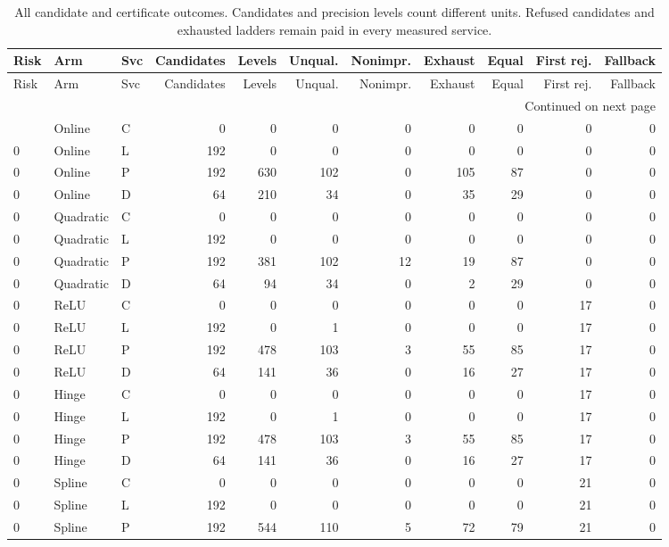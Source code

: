 \begingroup
\scriptsize
\setlength{\tabcolsep}{3pt}
\begin{longtable}{lllrrrrrrrr}
\caption{All candidate and certificate outcomes. Candidates and precision levels count different units. Refused candidates and exhausted ladders remain paid in every measured service.}\label{tab:alltrials120}\\
\toprule
Risk & Arm & Svc & Candidates & Levels & Unqual. & Nonimpr. & Exhaust & Equal & First rej. & Fallback \\ \midrule
\endfirsthead
\toprule
Risk & Arm & Svc & Candidates & Levels & Unqual. & Nonimpr. & Exhaust & Equal & First rej. & Fallback \\ \midrule
\endhead
\midrule\multicolumn{11}{r}{Continued on next page}\\\endfoot
\bottomrule\endlastfoot
0 & Online & C & 0 & 0 & 0 & 0 & 0 & 0 & 0 & 0 \\
0 & Online & L & 192 & 0 & 0 & 0 & 0 & 0 & 0 & 0 \\
0 & Online & P & 192 & 630 & 102 & 0 & 105 & 87 & 0 & 0 \\
0 & Online & D & 64 & 210 & 34 & 0 & 35 & 29 & 0 & 0 \\
0 & Quadratic & C & 0 & 0 & 0 & 0 & 0 & 0 & 0 & 0 \\
0 & Quadratic & L & 192 & 0 & 0 & 0 & 0 & 0 & 0 & 0 \\
0 & Quadratic & P & 192 & 381 & 102 & 12 & 19 & 87 & 0 & 0 \\
0 & Quadratic & D & 64 & 94 & 34 & 0 & 2 & 29 & 0 & 0 \\
0 & ReLU & C & 0 & 0 & 0 & 0 & 0 & 0 & 17 & 0 \\
0 & ReLU & L & 192 & 0 & 1 & 0 & 0 & 0 & 17 & 0 \\
0 & ReLU & P & 192 & 478 & 103 & 3 & 55 & 85 & 17 & 0 \\
0 & ReLU & D & 64 & 141 & 36 & 0 & 16 & 27 & 17 & 0 \\
0 & Hinge & C & 0 & 0 & 0 & 0 & 0 & 0 & 17 & 0 \\
0 & Hinge & L & 192 & 0 & 1 & 0 & 0 & 0 & 17 & 0 \\
0 & Hinge & P & 192 & 478 & 103 & 3 & 55 & 85 & 17 & 0 \\
0 & Hinge & D & 64 & 141 & 36 & 0 & 16 & 27 & 17 & 0 \\
0 & Spline & C & 0 & 0 & 0 & 0 & 0 & 0 & 21 & 0 \\
0 & Spline & L & 192 & 0 & 0 & 0 & 0 & 0 & 21 & 0 \\
0 & Spline & P & 192 & 544 & 110 & 5 & 72 & 79 & 21 & 0 \\

\end{longtable}
